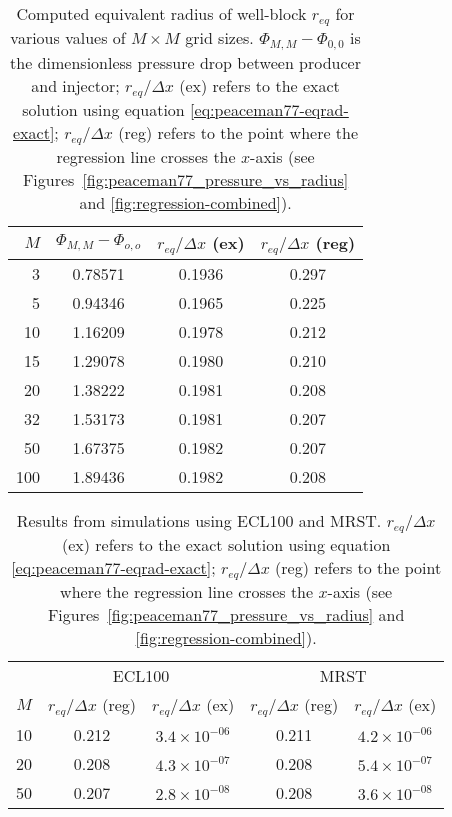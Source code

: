 \begin{table}[htbp]
    \centering
    \caption{Computed equivalent radius of well-block $r_{eq}$ for various values of $M\times M$ grid sizes. $\Phi_{M,M} - \Phi_{0,0}$ is the dimensionless pressure drop between producer and injector; $r_{eq}/\Delta x$ (ex) refers to the exact solution using equation \eqref{eq:peaceman77-eqrad-exact}; $r_{eq} / \Delta x$ (reg) refers to the point where the regression line crosses the $x$-axis (see Figures~\ref{fig:peaceman77_pressure_vs_radius} and \ref{fig:regression-combined}).}
    \begin{tabular}{r|ccc}
        \toprule
        $M$ & $\Phi_{M,M} - \Phi_{o,o}$ & $r_{eq}/\Delta x$ (ex) & $r_{eq} / \Delta x$ (reg)  \\
        \midrule
        3   & 0.78571 & 0.1936 & 0.297 \\
        5   & 0.94346 & 0.1965 & 0.225 \\
        10  & 1.16209 & 0.1978 & 0.212 \\
        15  & 1.29078 & 0.1980 & 0.210 \\
        20  & 1.38222 & 0.1981 & 0.208 \\
        32  & 1.53173 & 0.1981 & 0.207 \\
        50  & 1.67375 & 0.1982 & 0.207 \\
        100 & 1.89436 & 0.1982 & 0.208 \\
        \bottomrule
    \end{tabular}
    \label{tbl:peaceman-results}
\end{table}

\begin{table}[htbp]
\centering
    \caption{Results from simulations using ECL100 and MRST. $r_{eq}/\Delta x$ (ex) refers to the exact solution using equation \eqref{eq:peaceman77-eqrad-exact}; $r_{eq} / \Delta x$ (reg) refers to the point where the regression line crosses the $x$-axis (see Figures~\ref{fig:peaceman77_pressure_vs_radius} and \ref{fig:regression-combined}).}
    \begin{tabular}{c|cc|cc}
        \toprule
            & \multicolumn{2}{c|}{ECL100} & \multicolumn{2}{c}{MRST} \\
        $M$ &  $r_{eq}/\Delta x$ (reg) & $r_{eq}/\Delta x$ (ex) & $r_{eq}/\Delta x$ (reg) & $r_{eq}/\Delta x$ (ex) \\
        \midrule
        10  & 0.212 & $3.4\times 10^{-06}$  &  0.211 & $4.2\times 10^{-06}$ \\
        20  & 0.208 & $4.3\times 10^{-07}$  &  0.208 & $5.4\times 10^{-07}$ \\
        50  & 0.207 & $2.8\times 10^{-08}$  &  0.208 & $3.6\times 10^{-08}$ \\
        \bottomrule
    \end{tabular}
    \label{tbl:simulation-results}
\end{table}

